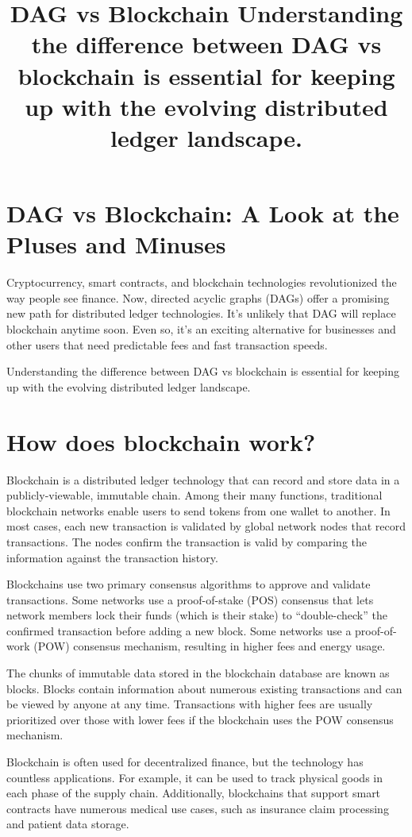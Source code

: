 \documentclass{article}
\title{DAG vs Blockchain
Understanding the difference between DAG vs blockchain is essential for keeping up with the evolving distributed ledger landscape.}
\begin{document}
\maketitle

\section{DAG vs Blockchain: A Look at the Pluses and Minuses}
Cryptocurrency, smart contracts, and blockchain technologies revolutionized the way people see finance. Now, directed acyclic graphs (DAGs) offer a promising new path for distributed ledger technologies. It’s unlikely that DAG will replace blockchain anytime soon. Even so, it’s an exciting alternative for businesses and other users that need predictable fees and fast transaction speeds.

Understanding the difference between DAG vs blockchain is essential for keeping up with the evolving distributed ledger landscape.

\section{How does blockchain work?}
Blockchain is a distributed ledger technology that can record and store data in a publicly-viewable, immutable chain. Among their many functions, traditional blockchain networks enable users to send tokens from one wallet to another. In most cases, each new transaction is validated by global network nodes that record transactions. The nodes confirm the transaction is valid by comparing the information against the transaction history.

Blockchains use two primary consensus algorithms to approve and validate transactions. Some networks use a proof-of-stake (POS) consensus that lets network members lock their funds (which is their stake) to “double-check” the confirmed transaction before adding a new block. Some networks use a proof-of-work (POW) consensus mechanism, resulting in higher fees and energy usage.

The chunks of immutable data stored in the blockchain database are known as blocks. Blocks contain information about numerous existing transactions and can be viewed by anyone at any time. Transactions with higher fees are usually prioritized over those with lower fees if the blockchain uses the POW consensus mechanism.

Blockchain is often used for decentralized finance, but the technology has countless applications. For example, it can be used to track physical goods in each phase of the supply chain. Additionally, blockchains that support smart contracts have numerous medical use cases, such as insurance claim processing and patient data storage.
\end{document}

